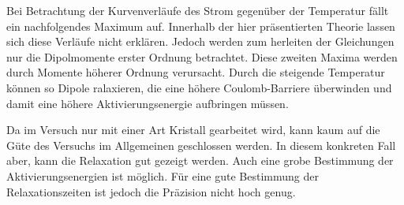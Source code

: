 Bei Betrachtung der Kurvenverläufe des Strom gegenüber der Temperatur fällt ein nachfolgendes Maximum auf. Innerhalb der hier präsentierten Theorie lassen sich diese Verläufe nicht erklären. Jedoch werden zum herleiten der Gleichungen nur die Dipolmomente erster Ordnung betrachtet. Diese zweiten Maxima werden durch Momente höherer Ordnung verursacht. Durch die steigende Temperatur können so Dipole ralaxieren, die eine höhere Coulomb-Barriere überwinden und damit eine höhere Aktivierungsenergie aufbringen müssen. 


Da im Versuch nur mit einer Art Kristall gearbeitet wird, kann kaum auf die Güte des Versuchs im Allgemeinen geschlossen werden. In diesem konkreten Fall aber, kann die Relaxation gut gezeigt werden. Auch eine grobe Bestimmung der Aktivierungsenergien ist möglich. Für eine gute Bestimmung der Relaxationszeiten ist jedoch die Präzision nicht hoch genug.
